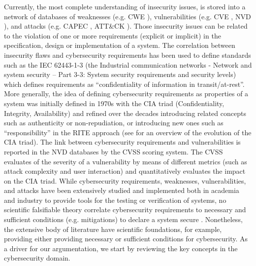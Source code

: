 \documentclass[conference]{IEEEtran}
\begin{document}
Currently, the most complete understanding of insecurity issues, is stored into
a network of databases of weaknesses (e.g.
CWE \autocite{MITRE2020CWEresearch}), vulnerabilities (e.g. CVE \autocite{CVE},
NVD \autocite{NIST2020NVD}), and attacks (e.g. CAPEC \autocite{MITRE2020CAPEC},
ATT\&CK \autocite{MITRE2020ATTACK}).  Those insecurity issues can be related to
the violation of one or more requirements (explicit or implicit) in the
specification, design or implementation of a system. The correlation 
between insecurity flaws and cybersecurity requirements has been used to define
standards such as the IEC 62443-1-3 (the Industrial communication networks -
Network and system security -- Part 3-3: System security requirements and
security levels) which defines requirements as ``confidentiality of information
in transit/at-rest''. More generally, the idea of defining cybersecurity requirements
as properties of a system was initially defined in 1970s with the 
CIA triad (Confidentiality, Integrity, Availability) and refined 
over the decades introducing related concepts such as authenticity or
non-repudiation, or introducing new ones such as ``responsibility'' in the
RITE approach (see \autocite{Samonas2014cia} for an overview of the evolution of the CIA triad).
The link between cybersecurity requirements and vulnerabilities is reported 
in the NVD databases by the CVSS \autocite{Mell2007CVSS} scoring system.
The CVSS evaluates of the severity of a vulnerability
by means of different metrics (such as attack complexity and user interaction)
and quantitatively evaluates the impact on the CIA triad.
While cybersecurity requirements, weaknesses, vulnerabilities, and attacks
have been extensively studied and implemented both in academia and industry
to provide tools for the testing or verification of systems, 
no scientific falsifiable theory correlate
cybersecurity requirements to necessary and sufficient conditions (e.g. mitigations) 
to declare a system secure \autocite{Herley2016unfalsifiability}.
Nonetheless, the extensive body of literature have scientific foundations,
for example, providing either providing necessary or sufficient conditions
for cybersecurity.
As a driver for our argumentation, we start by reviewing the key concepts
in the cybersecurity domain.
\end{document}
